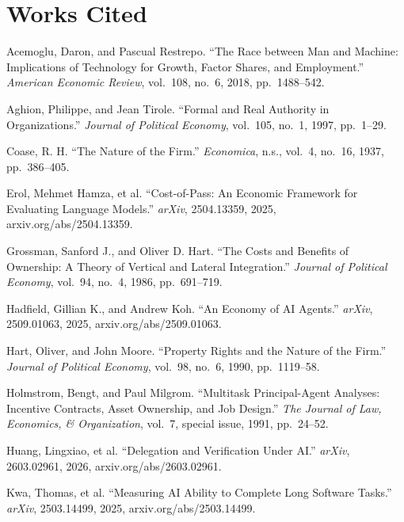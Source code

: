 \documentclass[10pt]{article}
\theoremstyle{remark}
\begin{document}
\section*{Works Cited}
\small
\begin{list}{}{\setlength{\itemindent}{-2em}\setlength{\leftmargin}{2em}\setlength{\itemsep}{1pt}\setlength{\parsep}{0pt}}
\item Acemoglu, Daron, and Pascual Restrepo. ``The Race between Man and Machine: Implications of Technology for Growth, Factor Shares, and Employment.'' \emph{American Economic Review}, vol.~108, no.~6, 2018, pp.~1488--542.
\item Aghion, Philippe, and Jean Tirole. ``Formal and Real Authority in Organizations.'' \emph{Journal of Political Economy}, vol.~105, no.~1, 1997, pp.~1--29.
\item Coase, R. H. ``The Nature of the Firm.'' \emph{Economica}, n.s., vol.~4, no.~16, 1937, pp.~386--405.
\item Erol, Mehmet Hamza, et al. ``Cost-of-Pass: An Economic Framework for Evaluating Language Models.'' \emph{arXiv}, 2504.13359, 2025, arxiv.org/abs/2504.13359.
\item Grossman, Sanford J., and Oliver D. Hart. ``The Costs and Benefits of Ownership: A Theory of Vertical and Lateral Integration.'' \emph{Journal of Political Economy}, vol.~94, no.~4, 1986, pp.~691--719.
\item Hadfield, Gillian K., and Andrew Koh. ``An Economy of AI Agents.'' \emph{arXiv}, 2509.01063, 2025, arxiv.org/abs/2509.01063.
\item Hart, Oliver, and John Moore. ``Property Rights and the Nature of the Firm.'' \emph{Journal of Political Economy}, vol.~98, no.~6, 1990, pp.~1119--58.
\item Holmstrom, Bengt, and Paul Milgrom. ``Multitask Principal-Agent Analyses: Incentive Contracts, Asset Ownership, and Job Design.'' \emph{The Journal of Law, Economics, \& Organization}, vol.~7, special issue, 1991, pp.~24--52.
\item Huang, Lingxiao, et al. ``Delegation and Verification Under AI.'' \emph{arXiv}, 2603.02961, 2026, arxiv.org/abs/2603.02961.
\item Kwa, Thomas, et al. ``Measuring AI Ability to Complete Long Software Tasks.'' \emph{arXiv}, 2503.14499, 2025, arxiv.org/abs/2503.14499.

\end{list}
\end{document}
